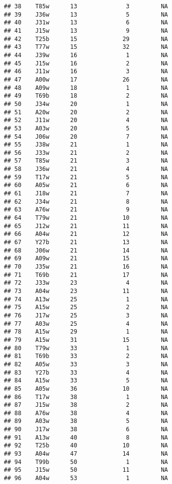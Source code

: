 \documentclass[
]{article}
\begin{document}
\begin{verbatim}
## 38    T85w      13              3         NA
## 39    J36w      13              5         NA
## 40    J31w      13              6         NA
## 41    J15w      13              9         NA
## 42    T25b      15             29         NA
## 43    T77w      15             32         NA
## 44    J39w      16              1         NA
## 45    J15w      16              2         NA
## 46    J11w      16              3         NA
## 47    A00w      17             26         NA
## 48    A09w      18              1         NA
## 49    T69b      18              2         NA
## 50    J34w      20              1         NA
## 51    A20w      20              2         NA
## 52    J11w      20              4         NA
## 53    A03w      20              5         NA
## 54    J06w      20              7         NA
## 55    J38w      21              1         NA
## 56    J33w      21              2         NA
## 57    T85w      21              3         NA
## 58    J36w      21              4         NA
## 59    T17w      21              5         NA
## 60    A05w      21              6         NA
## 61    J18w      21              7         NA
## 62    J34w      21              8         NA
## 63    A76w      21              9         NA
## 64    T79w      21             10         NA
## 65    J12w      21             11         NA
## 66    A04w      21             12         NA
## 67    Y27b      21             13         NA
## 68    J06w      21             14         NA
## 69    A09w      21             15         NA
## 70    J35w      21             16         NA
## 71    T69b      21             17         NA
## 72    J33w      23              4         NA
## 73    A04w      23             11         NA
## 74    A13w      25              1         NA
## 75    A15w      25              2         NA
## 76    J17w      25              3         NA
## 77    A03w      25              4         NA
## 78    A15w      29              1         NA
## 79    A15w      31             15         NA
## 80    T79w      33              1         NA
## 81    T69b      33              2         NA
## 82    A05w      33              3         NA
## 83    Y27b      33              4         NA
## 84    A15w      33              5         NA
## 85    A05w      36             10         NA
## 86    T17w      38              1         NA
## 87    J15w      38              2         NA
## 88    A76w      38              4         NA
## 89    A03w      38              5         NA
## 90    J17w      38              6         NA
## 91    A13w      40              8         NA
## 92    T25b      40             10         NA
## 93    A04w      47             14         NA
## 94    T99b      50              1         NA
## 95    J15w      50             11         NA
## 96    A04w      53              1         NA
\end{verbatim}
\end{document}
